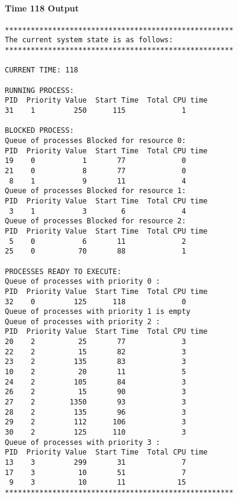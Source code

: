 \paragraph*{Time 118 Output}
\indent \fontsize{10}{9.7}\selectfont \begin{verbatim}
*****************************************************
The current system state is as follows:
*****************************************************

CURRENT TIME: 118

RUNNING PROCESS:
PID  Priority Value  Start Time  Total CPU time
31    1         250      115             1

BLOCKED PROCESS:
Queue of processes Blocked for resource 0:
PID  Priority Value  Start Time  Total CPU time
19    0           1       77             0
21    0           8       77             0
 8    1           9       11             4
Queue of processes Blocked for resource 1:
PID  Priority Value  Start Time  Total CPU time
 3    1           3        6             4
Queue of processes Blocked for resource 2:
PID  Priority Value  Start Time  Total CPU time
 5    0           6       11             2
25    0          70       88             1

PROCESSES READY TO EXECUTE:
Queue of processes with priority 0 :
PID  Priority Value  Start Time  Total CPU time
32    0         125      118             0
Queue of processes with priority 1 is empty
Queue of processes with priority 2 :
PID  Priority Value  Start Time  Total CPU time
20    2          25       77             3
22    2          15       82             3
23    2         135       83             3
10    2          20       11             5
24    2         105       84             3
26    2          15       90             3
27    2        1350       93             3
28    2         135       96             3
29    2         112      106             3
30    2         125      110             3
Queue of processes with priority 3 :
PID  Priority Value  Start Time  Total CPU time
13    3         299       31             7
17    3          10       51             7
 9    3          10       11            15
*****************************************************
\end{verbatim}
\newpage
